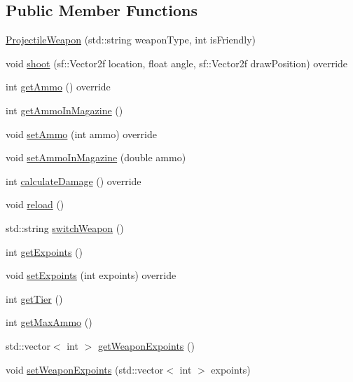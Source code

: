 \subsection*{Public Member Functions}
\begin{DoxyCompactItemize}
\item 
\hyperlink{class_projectile_weapon_a81de964b3548d21ce421418c836382f7}{Projectile\+Weapon} (std\+::string weapon\+Type, int is\+Friendly)
\item 
void \hyperlink{class_projectile_weapon_a3b8ac3bc8d558c0463bdc7646f8536dd}{shoot} (sf\+::\+Vector2f location, float angle, sf\+::\+Vector2f draw\+Position) override
\item 
int \hyperlink{class_projectile_weapon_ac2f5b5c83f10c8276d55b2ccb7ecb20d}{get\+Ammo} () override
\item 
int \hyperlink{class_projectile_weapon_ae4f099c2cc68a8ce6730cdf7a6af9c2f}{get\+Ammo\+In\+Magazine} ()
\item 
void \hyperlink{class_projectile_weapon_a8de598f1c4d7a6855122bcf5275eef22}{set\+Ammo} (int ammo) override
\item 
void \hyperlink{class_projectile_weapon_a81ed9a87457b1d2bb981c3e6d2edb718}{set\+Ammo\+In\+Magazine} (double ammo)
\item 
int \hyperlink{class_projectile_weapon_ac22fc52f32322606f406da802effadf0}{calculate\+Damage} () override
\item 
void \hyperlink{class_projectile_weapon_ac3db103d22e626c9c768e558f4acc400}{reload} ()
\item 
std\+::string \hyperlink{class_projectile_weapon_a2340178be143bc55fa7f6f06ef734cdc}{switch\+Weapon} ()
\item 
int \hyperlink{class_projectile_weapon_a33ecba020d6cb082526de8d771c2e80f}{get\+Expoints} ()
\item 
void \hyperlink{class_projectile_weapon_ac2051c4518fcc9c04ee6b44adeffb0c2}{set\+Expoints} (int expoints) override
\item 
int \hyperlink{class_projectile_weapon_a527dc08d45143ff4e1aabef407bbcffa}{get\+Tier} ()
\item 
int \hyperlink{class_projectile_weapon_a3a9ecd0524dfd10e721b215a3650b865}{get\+Max\+Ammo} ()
\item 
std\+::vector$<$ int $>$ \hyperlink{class_projectile_weapon_a43212edcad2cf1f68f0137ce0fe6db92}{get\+Weapon\+Expoints} ()
\item 
void \hyperlink{class_projectile_weapon_a84ba268c474eccf700ecc9413bd6e18d}{set\+Weapon\+Expoints} (std\+::vector$<$ int $>$ expoints)
\end{DoxyCompactItemize}


